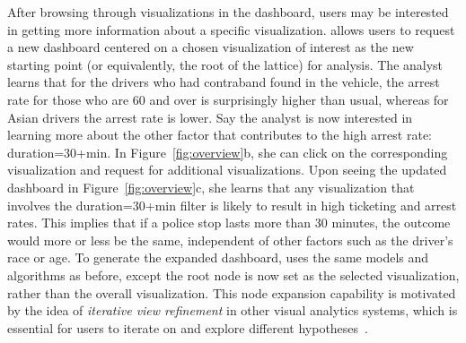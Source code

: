 \par After browsing through visualizations in the dashboard, users may be interested in getting more information about a specific visualization. \system allows users to request a new dashboard centered on a chosen visualization of interest as the new starting point (or equivalently, the root of the lattice) for analysis. The analyst learns that for the drivers who had contraband found in the vehicle, the arrest rate for those who are 60 and over is surprisingly higher than usual, whereas for Asian drivers the arrest rate is lower. Say the analyst is now interested in learning more about the other factor that contributes to the high arrest rate: duration=30+min. In Figure~\ref{fig:overview}b, she can click on the corresponding visualization and request for additional visualizations. Upon seeing the updated dashboard in Figure~\ref{fig:overview}c, she learns that any visualization that involves the duration=30+min filter is likely to result in high ticketing and arrest rates. This implies that if a police stop lasts more than 30 minutes, the outcome would more or less be the same, independent of other factors such as the driver's race or age. To generate the expanded dashboard, \system uses the same models and algorithms as before, except the root node is now set as the selected visualization, rather than the overall visualization. This node expansion capability is motivated by the idea of \textit{iterative view refinement} in other visual analytics systems, which is essential for users to iterate on and explore different hypotheses~\cite{Hoque2017,Wongsuphasawat2016}.
